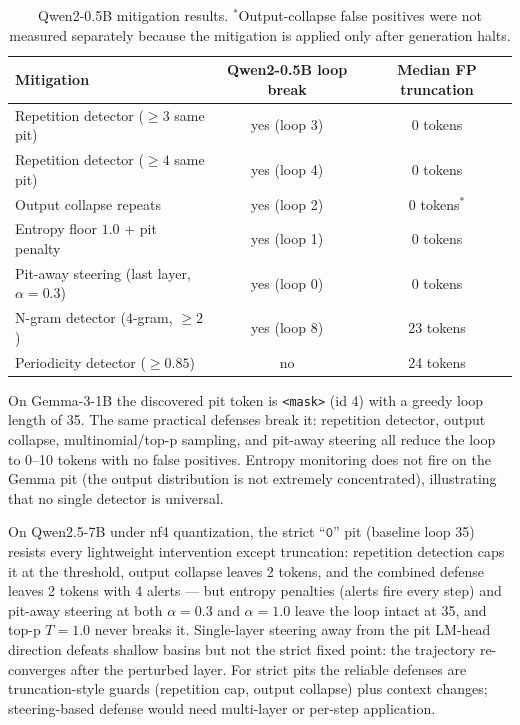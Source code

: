 \documentclass{article}
\begin{document}
\begin{table}[h]
\centering
\begin{tabular}{lcc}
\toprule
Mitigation & Qwen2-0.5B loop break & Median FP truncation \\
\midrule
Repetition detector ($\geq 3$ same pit) & yes (loop 3) & 0 tokens \\
Repetition detector ($\geq 4$ same pit) & yes (loop 4) & 0 tokens \\
Output collapse repeats & yes (loop 2) & 0 tokens$^*$ \\
Entropy floor $1.0$ + pit penalty & yes (loop 1) & 0 tokens \\
Pit-away steering (last layer, $\alpha=0.3$) & yes (loop 0) & 0 tokens \\
N-gram detector ($4$-gram, $\geq 2$) & yes (loop 8) & 23 tokens \\
Periodicity detector ($\geq 0.85$) & no & 24 tokens \\
\bottomrule
\end{tabular}
\caption{Qwen2-0.5B mitigation results. $^*$Output-collapse false positives were
not measured separately because the mitigation is applied only after generation
halts.}
\label{tab:mitigations}
\end{table}

On Gemma-3-1B the discovered pit token is \texttt{<mask>} (id 4) with a greedy
loop length of 35. The same practical defenses break it: repetition detector,
output collapse, multinomial/top-p sampling, and pit-away steering all reduce
the loop to 0--10 tokens with no false positives. Entropy monitoring does not
fire on the Gemma pit (the output distribution is not extremely concentrated),
illustrating that no single detector is universal.

On Qwen2.5-7B under nf4 quantization, the strict ``$\mathtt{0}$'' pit
(baseline loop 35) resists every lightweight intervention except truncation:
repetition detection caps it at the threshold, output collapse leaves 2 tokens,
and the combined defense leaves 2 tokens with 4 alerts --- but entropy penalties
(alerts fire every step) and pit-away steering at both $\alpha=0.3$ and
$\alpha=1.0$ leave the loop intact at 35, and top-p $T=1.0$ never breaks it.
Single-layer steering away from the pit LM-head direction defeats shallow
basins but not the strict fixed point: the trajectory re-converges after the
perturbed layer. For strict pits the reliable defenses are truncation-style
guards (repetition cap, output collapse) plus context changes; steering-based
defense would need multi-layer or per-step application.
\end{document}
